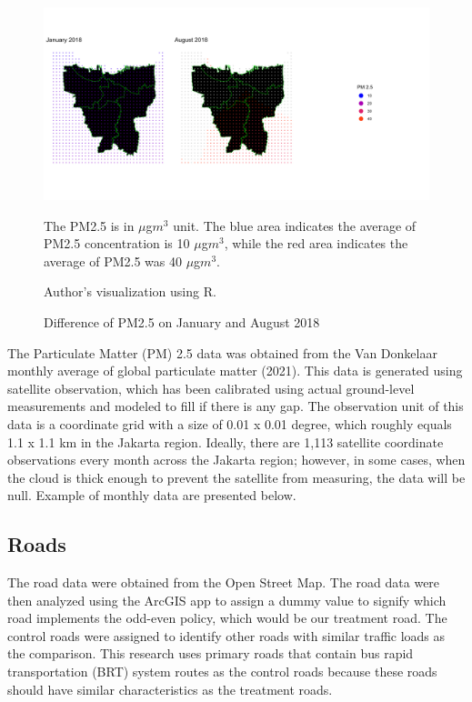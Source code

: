 \documentclass[AEJ]{AEA}
\begin{document}
\begin{figure}
    \hspace*{0.5cm}
    \includegraphics[width=1.2\linewidth]{Graphs/Jakarta_map.png}
    \vspace{-5em}
    \caption{Difference of PM2.5 on January and August 2018}
    \label{fig:Jakarta PM2.5 map on January and August 2018}
    \begin{figurenotes}
The PM2.5 is in $\mu$g$m^3$ unit. The blue area indicates the average of PM2.5 concentration is 10 $\mu$g$m^3$, while the red area indicates the average of PM2.5 was 40 $\mu$g$m^3$.
\end{figurenotes}
\begin{figurenotes}[Source]
Author's visualization using R.
\end{figurenotes}
\end{figure}
The Particulate Matter (PM) 2.5 data was obtained from the Van Donkelaar monthly average of global particulate matter (2021). This data is generated using satellite observation, which has been calibrated using actual ground-level measurements and modeled to fill if there is any gap. The observation unit of this data is a coordinate grid with a size of 0.01 x 0.01 degree, which roughly equals 1.1 x 1.1 km in the Jakarta region. Ideally, there are 1,113 satellite coordinate observations every month across the Jakarta region; however, in some cases, when the cloud is thick enough to prevent the satellite from measuring, the data will be null. Example of monthly data are presented below.



\vspace{15em}
\subsection{Roads}

The road data were obtained from the Open Street Map. The road data were then analyzed using the ArcGIS app to assign a dummy value to signify which road implements the odd-even policy, which would be our treatment road. The control roads were assigned to identify other roads with similar traffic loads as the comparison. This research uses primary roads that contain bus rapid transportation (BRT) system routes as the control roads because these roads should have similar characteristics as the treatment roads.
\end{document}
